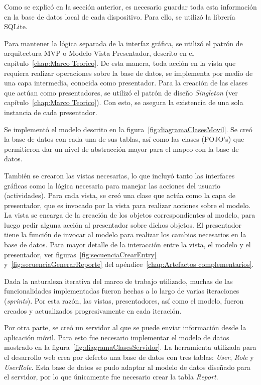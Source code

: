 Como se explicó en la sección anterior, es necesario guardar toda esta información en la base de datos local de cada dispositivo. Para ello, se utilizó la librería SQLite.

Para mantener la lógica separada de la interfaz gráfica, se utilizó el patrón de arquitectura MVP o Modelo Vista Presentador, descrito en el capítulo~\ref{chap:Marco Teorico}. De esta manera, toda acción en la vista que requiera realizar operaciones sobre la base de datos, se implementa por medio de una capa intermedia, conocida como presentador. %
Para la creación de las clases que actúan como presentadores, se utilizó el patrón de diseño \textit{Singleton} (ver capítulo~\ref{chap:Marco Teorico}). Con esto, se asegura la existencia de una sola instancia de cada presentador. 

Se implementó el modelo descrito en la figura~\ref{fig:diagramaClasesMovil}. Se creó la base de datos con cada una de sus tablas, así como las clases (POJO's) que permitieron dar un nivel de abstracción mayor para el mapeo con la base de datos.

También se crearon las vistas necesarias, lo que incluyó tanto las interfaces gráficas como la lógica necesaria para manejar las acciones del usuario (actividades). Para cada vista, se creó una clase que actúa como la capa de presentador, que es invocado por la vista para realizar acciones sobre el modelo. La vista se encarga de la creación de los objetos correspondientes al modelo, para luego pedir alguna acción al presentador sobre dichos objetos. El presentador tiene la función de invocar al modelo para realizar los cambios necesarios en la base de datos. Para mayor detalle de la interacción entre la vista, el modelo y el presentador, ver figuras~\ref{fig:secuenciaCrearEntry} y~\ref{fig:secuenciaGenerarReporte} del apéndice~\ref{chap:Artefactos complementarios}.

Dada la naturaleza iterativa del marco de trabajo utilizado, muchas de las funcionalidades implementadas fueron hechas a lo largo de varias iteraciones (\textit{sprints}). Por esta razón, las vistas, presentadores, así como el modelo, fueron creados y actualizados progresivamente en cada iteración.

Por otra parte, se creó un servidor al que se puede enviar información desde la aplicación móvil. 
Para esto fue necesario implementar el modelo de datos mostrado en la figura~\ref{fig:diagramaClasesServidor}. La herramienta utilizada para el desarrollo web crea por defecto una base de datos con tres tablas: \textit{User}, \textit{Role} y \textit{UserRole}. Esta base de datos se pudo adaptar al modelo de datos diseñado para el servidor, por lo que únicamente fue necesario crear la tabla \textit{Report}.

